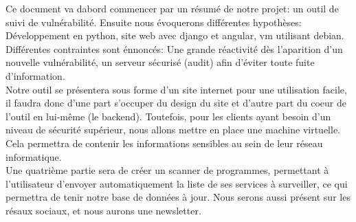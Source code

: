 Ce document va dabord commencer par un résumé de notre projet: un outil de suivi de vulnérabilité. Ensuite nous évoquerons différentes hypothèses: Développement en python, site web avec django et angular, vm utilisant debian. Différentes contraintes sont énnoncés: Une grande réactivité dès l'aparition d'un nouvelle vulnérabilité, un serveur sécurisé (audit) afin d'éviter toute fuite d'information.\\
Notre outil se présentera sous forme d'un site internet pour une utilisation facile, il faudra donc d'une part s'occuper du design du site et d'autre part du coeur de l'outil en lui-même (le backend). Toutefois, pour les clients ayant besoin d'un niveau de sécurité supérieur, nous allons mettre en place une machine virtuelle. Cela permettra de contenir les informations sensibles au sein de leur réseau informatique.\\
Une quatrième partie sera de créer un scanner de programmes, permettant à l'utilisateur d'envoyer automatiquement la liste de ses services à surveiller, ce qui permettra de tenir notre base de données à jour. Nous serons aussi présent sur les résaux sociaux, et nous aurons une newsletter.\\